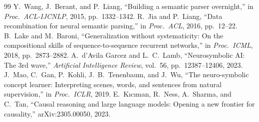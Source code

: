 \documentclass[12pt,a4paper]{article}
\begin{document}
\begin{thebibliography}{99}
 Y.~Wang, J.~Berant, and P.~Liang, ``Building a semantic parser overnight,'' in \emph{Proc.\ ACL-IJCNLP}, 2015, pp.~1332--1342.
 R.~Jia and P.~Liang, ``Data recombination for neural semantic parsing,'' in \emph{Proc.\ ACL}, 2016, pp.~12--22.
 B.~Lake and M.~Baroni, ``Generalization without systematicity: On the compositional skills of sequence-to-sequence recurrent networks,'' in \emph{Proc.\ ICML}, 2018, pp.~2873--2882.
 A.~d'Avila Garcez and L.~C.~Lamb, ``Neurosymbolic AI: The 3rd wave,'' \emph{Artificial Intelligence Review}, vol.~56, pp.~12387--12406, 2023.
 J.~Mao, C.~Gan, P.~Kohli, J.~B.~Tenenbaum, and J.~Wu, ``The neuro-symbolic concept learner: Interpreting scenes, words, and sentences from natural supervision,'' in \emph{Proc.\ ICLR}, 2019.
 E.~K{\i}c{\i}man, R.~Ness, A.~Sharma, and C.~Tan, ``Causal reasoning and large language models: Opening a new frontier for causality,'' arXiv:2305.00050, 2023.
\end{thebibliography}
\endgroup
\end{document}
